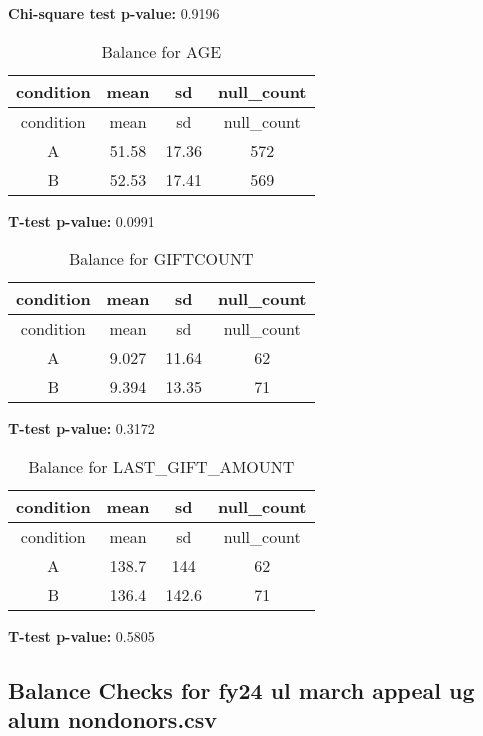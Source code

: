 \documentclass[
]{article}
\begin{document}
\textbf{Chi-square test p-value:} 0.9196\\
\pagebreak

\begin{longtable}[]{@{}cccc@{}}
\caption{Balance for AGE}\tabularnewline
\toprule\noalign{}
condition & mean & sd & null\_count \\
\midrule\noalign{}
\endfirsthead
\toprule\noalign{}
condition & mean & sd & null\_count \\
\midrule\noalign{}
\endhead
\bottomrule\noalign{}
\endlastfoot
A & 51.58 & 17.36 & 572 \\
B & 52.53 & 17.41 & 569 \\
\end{longtable}

\textbf{T-test p-value:} 0.0991\\
\pagebreak

\begin{longtable}[]{@{}cccc@{}}
\caption{Balance for GIFTCOUNT}\tabularnewline
\toprule\noalign{}
condition & mean & sd & null\_count \\
\midrule\noalign{}
\endfirsthead
\toprule\noalign{}
condition & mean & sd & null\_count \\
\midrule\noalign{}
\endhead
\bottomrule\noalign{}
\endlastfoot
A & 9.027 & 11.64 & 62 \\
B & 9.394 & 13.35 & 71 \\
\end{longtable}

\textbf{T-test p-value:} 0.3172\\
\pagebreak

\begin{longtable}[]{@{}cccc@{}}
\caption{Balance for LAST\_GIFT\_AMOUNT}\tabularnewline
\toprule\noalign{}
condition & mean & sd & null\_count \\
\midrule\noalign{}
\endfirsthead
\toprule\noalign{}
condition & mean & sd & null\_count \\
\midrule\noalign{}
\endhead
\bottomrule\noalign{}
\endlastfoot
A & 138.7 & 144 & 62 \\
B & 136.4 & 142.6 & 71 \\
\end{longtable}

\textbf{T-test p-value:} 0.5805\\
\pagebreak \clearpage

\subsection{Balance Checks for fy24 ul march appeal ug alum
nondonors.csv}\label{balance-checks-for-fy24-ul-march-appeal-ug-alum-nondonors.csv}
\end{document}
